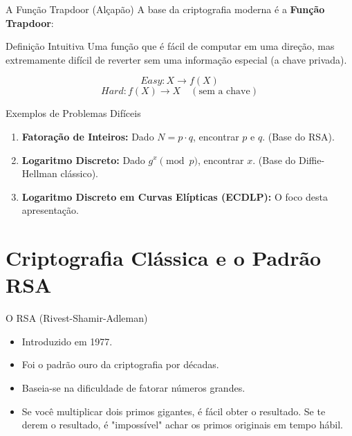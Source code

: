 \documentclass[aspectratio=169]{beamer}
\begin{document}
\begin{frame}{A Função Trapdoor (Alçapão)}
  A base da criptografia moderna é a \textbf{Função Trapdoor}:
  
  \vspace{0.5cm}
  \begin{block}{Definição Intuitiva}
    Uma função que é fácil de computar em uma direção, mas extremamente difícil de reverter sem uma informação especial (a chave privada).
  \end{block}
  
  \vspace{0.3cm}
  $$ Easy: X \rightarrow f(X) $$
  $$ Hard: f(X) \rightarrow X \quad (\text{sem a chave}) $$
\end{frame}

\begin{frame}{Exemplos de Problemas Difíceis}
  \begin{enumerate}
      \item \textbf{Fatoração de Inteiros:} Dado $N = p \cdot q$, encontrar $p$ e $q$. (Base do RSA).
      \item \textbf{Logaritmo Discreto:} Dado $g^x \pmod p$, encontrar $x$. (Base do Diffie-Hellman clássico).
      \item \textbf{Logaritmo Discreto em Curvas Elípticas (ECDLP):} O foco desta apresentação.
  \end{enumerate}
\end{frame}

\section{Criptografia Clássica e o Padrão RSA}

\begin{frame}{O RSA (Rivest-Shamir-Adleman)}
  \begin{itemize}
      \item Introduzido em 1977.
      \item Foi o padrão ouro da criptografia por décadas.
      \item Baseia-se na dificuldade de fatorar números grandes.
      \item Se você multiplicar dois primos gigantes, é fácil obter o resultado. Se te derem o resultado, é "impossível" achar os primos originais em tempo hábil.
  \end{itemize}
\end{frame}
\end{document}
